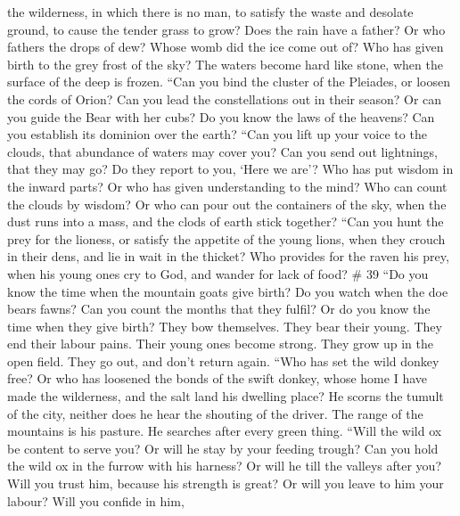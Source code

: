 the wilderness, in which there is no man,  to satisfy the
waste and desolate ground, to cause the tender grass to grow?
 Does the rain have a father? Or who fathers the drops of
dew?  Whose womb did the ice come out of? Who has given
birth to the grey frost of the sky?  The waters become hard
like stone, when the surface of the deep is frozen.  ``Can
you bind the cluster of the Pleiades, or loosen the cords of Orion?
 Can you lead the constellations out in their season? Or
can you guide the Bear with her cubs?  Do you know the laws
of the heavens? Can you establish its dominion over the earth?
 ``Can you lift up your voice to the clouds, that abundance
of waters may cover you?  Can you send out lightnings, that
they may go? Do they report to you, `Here we are'?  Who has
put wisdom in the inward parts? Or who has given understanding to the
mind?  Who can count the clouds by wisdom? Or who can pour
out the containers of the sky,  when the dust runs into a
mass, and the clods of earth stick together?  ``Can you
hunt the prey for the lioness, or satisfy the appetite of the young
lions,  when they crouch in their dens, and lie in wait in
the thicket?  Who provides for the raven his prey, when his
young ones cry to God, and wander for lack of food? \# 39 
``Do you know the time when the mountain goats give birth? Do you watch
when the doe bears fawns?  Can you count the months that
they fulfil? Or do you know the time when they give birth? 
They bow themselves. They bear their young. They end their labour pains.
 Their young ones become strong. They grow up in the open
field. They go out, and don't return again.  ``Who has set
the wild donkey free? Or who has loosened the bonds of the swift donkey,
 whose home I have made the wilderness, and the salt land
his dwelling place?  He scorns the tumult of the city,
neither does he hear the shouting of the driver.  The range
of the mountains is his pasture. He searches after every green thing.
 ``Will the wild ox be content to serve you? Or will he stay
by your feeding trough?  Can you hold the wild ox in the
furrow with his harness? Or will he till the valleys after you?
 Will you trust him, because his strength is great? Or will
you leave to him your labour?  Will you confide in him,

